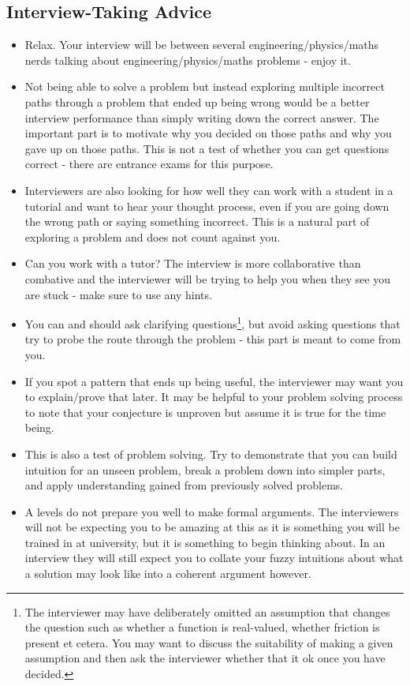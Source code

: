 \subsection*{Interview-Taking Advice}

\begin{itemize}
	\item Relax. Your interview will be between several engineering/physics/maths nerds talking about engineering/physics/maths problems - enjoy it.
	\item Not being able to solve a problem but instead exploring multiple incorrect paths through a problem that ended up being wrong would be a better interview performance than simply writing down the correct answer. The important part is to motivate why you decided on those paths and why you gave up on those paths. This is not a test of whether you can get questions correct - there are entrance exams for this purpose.
	\item Interviewers are also looking for how well they can work with a student in a tutorial and want to hear your thought process, even if you are going down the wrong path or saying something incorrect. This is a natural part of exploring a problem and does not count against you.
	\item Can you work with a tutor? The interview is more collaborative than combative and the interviewer will be trying to help you when they see you are stuck - make sure to use any hints.
	\item You can and should ask clarifying questions\footnote{The interviewer may have deliberately omitted an assumption that changes the question such as whether a function is real-valued, whether friction is present et cetera. You may want to discuss the suitability of making a given assumption and then ask the interviewer whether that it ok once you have decided.}, but avoid asking questions that try to probe the route through the problem - this part is meant to come from you.
	\item If you spot a pattern that ends up being useful, the interviewer may want you to explain/prove that later. It may be helpful to your problem solving process to note that your conjecture is unproven but assume it is true for the time being.
	\item This is also a test of problem solving. Try to demonstrate that you can build intuition for an unseen problem, break a problem down into simpler parts, and apply understanding gained from previously solved problems.
	\item A levels do not prepare you well to make formal arguments. The interviewers will not be expecting you to be amazing at this as it is something you will be trained in at university, but it is something to begin thinking about. In an interview they will still expect you to collate your fuzzy intuitions about what a solution may look like into a coherent argument however.
\end{itemize}

